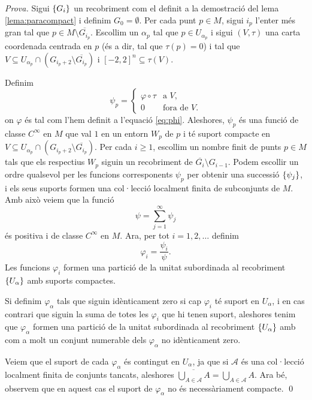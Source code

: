 {\color{green!50!black} 
    \textit{Prova.} 
    Sigui $\{G_i\}$ un recobriment com el definit a la demostració del lema \ref{lema:paracompact} i definim $G_0=\emptyset$. Per cada punt $p\in M$, sigui $i_p$ l'enter més gran tal que $p\in M\setminus \overline{G_{i_p}}$. Escollim un $\alpha_p$ tal que $p\in U_{\alpha_p}$ i sigui $(V,\tau)$ una carta coordenada centrada en $p$ (és a dir, tal que $\tau(p)=0$) i tal que $V\subseteq U_{\alpha_p}\cap(G_{i_p+2}\setminus \overline{G_{i_p}})$ i $[-2,2]^n\subseteq\tau(V)$.

    Definim 
    \begin{equation*}
        \psi_p = \begin{cases}
            \varphi\circ\tau & \text{a } V, \\
            0 & \text{fora de } V.
        \end{cases}
    \end{equation*}
    on $\varphi$ és tal com l'hem definit a l'equació \ref{eq:phi}. Aleshores, $\psi_p$ és una funció de classe $C^\infty$ en $M$ que val $1$ en un entorn $W_p$ de $p$ i té suport compacte en $V\subseteq U_{\alpha_p}\cap(G_{i_p+2}\setminus \overline{G_{i_p}})$. Per cada $i\ge1$, escollim un nombre finit de punts $p\in M$ tals que els respectius $W_p$ siguin un recobriment de $\overline{G_i}\setminus G_{i-1}$. Podem escollir un ordre qualsevol per les funcions corresponents $\psi_p$ per obtenir una successió $\{\psi_j\}$, i els seus suports formen una col·lecció localment finita de subconjunts de $M$. Amb això veiem que la funció 
    \begin{equation*}
        \psi = \sum_{j=1}^\infty \psi_j
    \end{equation*}
    és positiva i de classe $C^\infty$ en $M$. Ara, per tot $i=1,2,\dots$ definim 
    \begin{equation*}
        \varphi_i = \frac{\psi_i}{\psi}.
    \end{equation*}
    Les funcions $\varphi_i$ formen una partició de la unitat subordinada al recobriment $\{U_\alpha\}$ amb suports compactes.

    Si definim $\varphi_\alpha$ tals que siguin idènticament zero si cap $\varphi_i$ té suport en $U_\alpha$, i en cas contrari que siguin la suma de totes les $\varphi_i$ que hi tenen suport, aleshores tenim que $\varphi_\alpha$ formen una partició de la unitat subordinada al recobriment $\{U_\alpha\}$ amb com a molt un conjunt numerable dels $\varphi_\alpha$ no idènticament zero.

    Veiem que el suport de cada $\varphi_\alpha$ és contingut en $U_\alpha$, ja que si $\mathcal A$ és una col·lecció localment finita de conjunts tancats, aleshores $\overline{\bigcup_{A\in \mathcal A} A} = \bigcup_{A\in \mathcal A} A$. Ara bé, observem que en aquest cas el suport de $\varphi_\alpha$ no és necessàriament compacte.
    \qed
}
